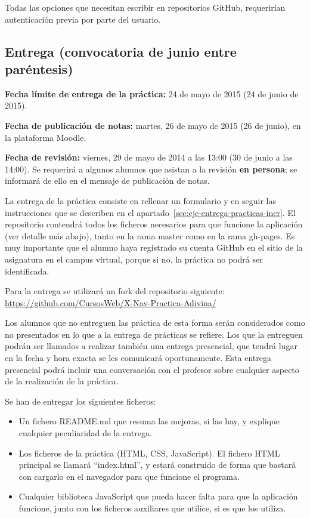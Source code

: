 Todas las opciones que necesitan escribir en repositorios GitHub, requerirían autenticación previa por parte del usuario.

\subsection{Entrega (convocatoria de junio entre paréntesis)}

\textbf{Fecha límite de entrega de la práctica:} 24 de mayo de 2015 (24 de junio de 2015).

\textbf{Fecha de publicación de notas:} martes, 26 de mayo de 2015 (26 de junio), en la plataforma Moodle.

\textbf{Fecha de revisión:} viernes, 29 de mayo de 2014 a las 13:00 (30 de junio a las 14:00). Se requerirá a algunos alumnos que asistan a la revisión {\bf en persona}; se informará de ello en el mensaje de publicación de notas.

La entrega de la práctica consiste en rellenar un formulario y en seguir las instrucciones que se describen en el apartado~\ref{sec:eje-entrega-practicas-incr}. El repositorio contendrá todos los ficheros necesarios para que funcione la aplicación (ver detalle más abajo), tanto en la rama master como en la rama gh-pages. Es muy importante que el alumno haya registrado su cuenta GitHub en el sitio de la asignatura en el campus virtual, porque si no, la práctica no podrá ser identificada.

Para la entrega se utilizará un fork del repositorio siguiente: \\
\url{https://github.com/CursosWeb/X-Nav-Practica-Adivina/}

Los alumnos que no entreguen las práctica de esta forma serán considerados como no presentados en lo que a la entrega de prácticas se refiere. Los que la entreguen podrán ser llamados a realizar también una entrega presencial, que tendrá lugar en la fecha y hora exacta se les comunicará oportunamente. Esta entrega presencial podrá incluir una conversación con el profesor sobre cualquier aspecto de la realización de la práctica.

Se han de entregar los siguientes ficheros:

\begin{itemize}
\item Un fichero README.md que resuma las mejoras, si las hay, y explique cualquier peculiaridad de la entrega.
\item Los ficheros de la práctica (HTML, CSS, JavaScript). El fichero HTML principal se llamará ``index.html'', y estará construido de forma que bastará con cargarlo en el navegador para que funcione el programa.
\item Cualquier biblioteca JavaScript que pueda hacer falta para que la aplicación funcione, junto con los ficheros auxiliares que utilice, si es que los utiliza.
\end{itemize}


